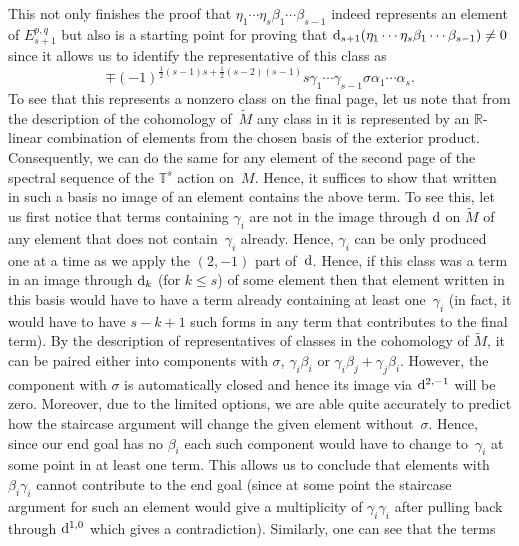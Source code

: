 \documentclass[pdftex]{sigma}
\numberwithin{equation}{section}
\theoremstyle{definition}
\begin{document}
This not only finishes the proof that $\eta_1\cdots \eta_s\beta_1\cdots \beta_{s-1}$ indeed represents an element of $E_{s+1}^{p,q}$ but also is a starting point for proving that ${\rm d}_{s+1}(\eta_1\cdots \eta_s\beta_1\cdots \beta_{s-1})\neq 0$ since it allows us to identify the representative of this class as
\[\mp (-1)^{\frac{1}{2}(s-1)s+\frac{1}{2}(s-2)(s-1)}s\gamma_1\cdots \gamma_{s-1}\sigma\alpha_1\cdots \alpha_s.\]
To see that this represents a nonzero class on the final page, let us note that from the description of the cohomology of~$\tilde{M}$ any class in it is represented by an $\mathbb{R}$-linear combination of elements from the chosen basis of the exterior product. Consequently, we can do the same for any element of the second page of the spectral sequence of the $\mathbb{T}^s$ action on~$M$. Hence, it suffices to show that written in such a basis no image of an element contains the above term. To see this, let us first notice that terms containing $\gamma_i$ are not in the image through ${\rm d}$ on $\tilde{M}$ of any element that does not contain~$\gamma_i$ already. Hence, $\gamma_i$ can be only produced one at a time as we apply the $(2,-1)$ part of~${\rm d}$. Hence, if this class was a term in an image through ${\rm d}_k$ (for $k\leq s$) of some element then that element written in this basis would have to have a term already containing at least one~$\gamma_i$ (in fact, it would have to have $s-k+1$ such forms in any term that contributes to the final term). By the description of representatives of classes in the cohomology of $\tilde{M}$, it can be paired either into components with $\sigma$, $\gamma_i\beta_i$ or $\gamma_i\beta_j+\gamma_j\beta_i$. However, the component with $\sigma$ is automatically closed and hence its image via ${\rm d}^{2,-1}$ will be zero. Moreover, due to the limited options, we are able quite accurately to predict how the staircase argument will change the given element without~$\sigma$. Hence, since our end goal has no $\beta_i$ each such component would have to change to~$\gamma_i$ at some point in at least one term. This allows us to conclude that elements with $\beta_i\gamma_i$ cannot contribute to the end goal (since at some point the staircase argument for such an element would give a multiplicity of $\gamma_i\gamma_i$ after pulling back through ${\rm d}^{1,0}$ which gives a contradiction). Similarly, one can see that the terms
\end{document}
